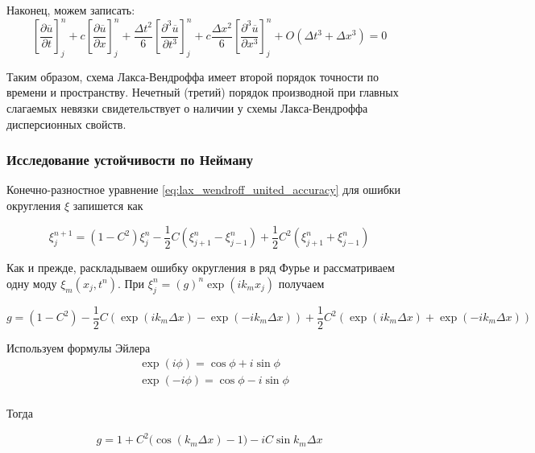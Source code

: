 Наконец, можем записать:
\begin{equation} \label{lax-wendroff_accurancy}
	\left[ \dfrac{\partial \overline{u}}{\partial t} \right]_j^n + c \left[ \dfrac{\partial \overline{u}}{\partial x} \right]_j^n + \dfrac{\Delta t^2}{6} \left[ \dfrac{\partial^3 \overline{u}}{\partial t^3} \right]_j^n +
	c \dfrac{\Delta x^2}{6} \left[ \dfrac{\partial^3 \overline{u}}{\partial x^3} \right]_j^n + O(\Delta t^3 + \Delta x^3) = 0
\end{equation}

Таким образом, схема Лакса-Вендроффа имеет второй порядок точности по времени и пространству. Нечетный (третий) порядок производной при главных слагаемых невязки свидетельствует о наличии у схемы Лакса-Вендроффа дисперсионных свойств.

\subsubsection{Исследование устойчивости по Нейману}

Конечно-разностное уравнение \eqref{eq:lax_wendroff_united_accuracy} для ошибки округления $\xi$ запишется как

\begin{equation}
	\xi_j^{n+1} = (1 - C^2) \xi_j^n - \dfrac{1}{2} C (\xi_{j+1}^n - \xi_{j-1}^n) + \dfrac{1}{2} C^2 (\xi_{j+1}^n + \xi_{j-1}^n)
\end{equation}

Как и прежде, раскладываем ошибку округления в ряд Фурье и рассматриваем одну моду $\xi_m (x_j, t^n)$. При $\xi_j^n = (g)^n \exp{(i k_m x_j)}$ получаем 

\begin{equation}
	g = (1 - C^2) - \dfrac{1}{2} C \left( \exp{(i k_m \Delta x)} - \exp{(-i k_m \Delta x)} \right) + \dfrac{1}{2} C^2 \left( \exp{(i k_m \Delta x)} + \exp{(-i k_m \Delta x)} \right)
\end{equation}	

Используем формулы Эйлера
\begin{equation*}
	\begin{split}
		&\exp(i \phi) = \cos{\phi} + i \sin{\phi} \\
		&\exp(- i \phi) = \cos{\phi} - i \sin{\phi} \\
	\end{split}
\end{equation*}

Тогда

\begin{equation} \label{lax-wendroff_g}
	g = 1 + C^2 (\cos{(k_m \Delta x) - 1)} - i C \sin{k_m \Delta x}
\end{equation}

